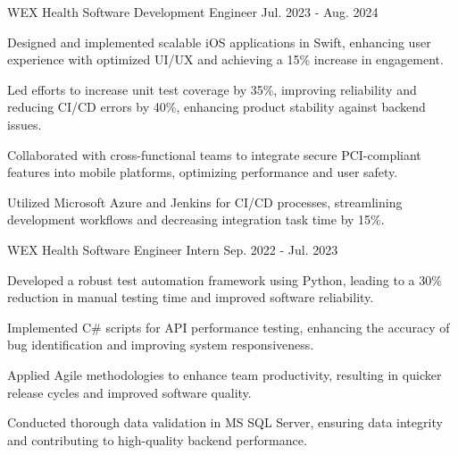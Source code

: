 


\begin{cventries}

      \cventry
        {WEX Health} %
        {Software Development Engineer} %
        {} %
        {Jul. 2023 - Aug. 2024} %
        {
          \begin{cvitems} %
          \item {Designed and implemented scalable iOS applications in Swift, enhancing user experience with optimized UI/UX and achieving a 15\% increase in engagement.}
    \item {Led efforts to increase unit test coverage by 35\%, improving reliability and reducing CI/CD errors by 40\%, enhancing product stability against backend issues.}
    \item {Collaborated with cross-functional teams to integrate secure PCI-compliant features into mobile platforms, optimizing performance and user safety.}
    \item {Utilized Microsoft Azure and Jenkins for CI/CD processes, streamlining development workflows and decreasing integration task time by 15\%.}
          \end{cvitems}
        }

      \cventry
        {WEX Health} %
        {Software Engineer Intern} %
        {} %
        {Sep. 2022 - Jul. 2023} %
        {
          \begin{cvitems} %
          \item {Developed a robust test automation framework using Python, leading to a 30\% reduction in manual testing time and improved software reliability.}
    \item {Implemented C\# scripts for API performance testing, enhancing the accuracy of bug identification and improving system responsiveness.}
    \item {Applied Agile methodologies to enhance team productivity, resulting in quicker release cycles and improved software quality.}
    \item {Conducted thorough data validation in MS SQL Server, ensuring data integrity and contributing to high-quality backend performance.}
          \end{cvitems}
        }


\end{cventries}
